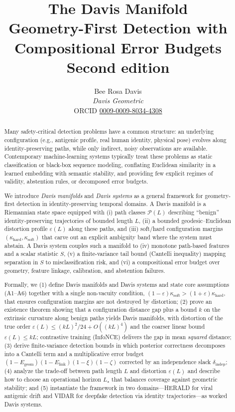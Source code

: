 \documentclass[11pt]{article}
\title{\textbf{The Davis Manifold}\\[0.5ex]
\large Geometry-First Detection with Compositional Error Budgets\\[0.3ex]
\normalsize Second edition}
\author{Bee Rosa Davis\\[1pt] {\normalsize\itshape Davis Geometric}\\[1pt]
{\footnotesize ORCID \href{https://orcid.org/0009-0009-8034-4308}{0009-0009-8034-4308}}}
\date{} %
\theoremstyle{remark}
\theoremstyle{plain}
\begin{document}
\maketitle
\vspace{-1.5ex}

\begin{abstract}
Many safety-critical detection problems have a common structure: an underlying configuration
(e.g., antigenic profile, real human identity, physical pose) evolves along identity-preserving
paths, while only indirect, noisy observations are available. Contemporary machine-learning
systems typically treat these problems as static classification or black-box sequence modeling,
conflating Euclidean similarity in a learned embedding with semantic stability, and providing
few explicit regimes of validity, abstention rules, or decomposed error budgets.

We introduce \emph{Davis manifolds} and \emph{Davis systems} as a general framework for
geometry-first detection in identity-preserving temporal domains. A Davis manifold is a
Riemannian state space equipped with (i) path classes $\mathcal{P}(L)$ describing ``benign''
identity-preserving trajectories of bounded length $L$, (ii) a bounded geodesic--Euclidean
distortion profile $\varepsilon(L)$ along these paths, and (iii) soft/hard configuration margins
$(\kappa_{\mathrm{hard}}, \kappa_{\mathrm{soft}})$ that carve out an explicit ambiguity band where the
system must abstain. A Davis system couples such a manifold to (iv) monotone
path-based features and a scalar statistic $S$, (v) a finite-variance tail bound (Cantelli
inequality) mapping separation in $S$ to misclassification risk, and (vi) a compositional
error budget over geometry, feature linkage, calibration, and abstention failures.

Formally, we (1) define Davis manifolds and Davis systems and state core assumptions
(A1--A6) together with a single non-vacuity condition,
$(1-\varepsilon)\kappa_{\mathrm{soft}} > (1+\varepsilon)\kappa_{\mathrm{hard}}$, that ensures configuration
margins are not destroyed by distortion; (2) prove an existence theorem showing that a configuration
distance gap plus a bound $k$ on the extrinsic curvature along benign paths yields Davis manifolds, with
distortion of the true order $\varepsilon(L) \le (kL)^2/24 + O((kL)^4)$ and the coarser linear bound
$\varepsilon(L) \le kL$; contrastive training (InfoNCE) delivers the gap in mean \emph{squared} distance;
(3) derive finite-variance detection bounds in which posterior correctness decomposes into
a Cantelli term and a multiplicative error budget $(1-E_{\text{geom}})(1-E_{\text{link}})
(1-\xi)(1-\zeta)$ corrected by an independence slack $\delta_{\text{indep}}$; (4) analyze the
trade-off between path length $L$ and distortion $\varepsilon(L)$ and describe how to choose
an operational horizon $L_\star$ that balances coverage against geometric stability; and
(5) instantiate the framework in two domains---HERALD for viral antigenic drift and
VIDAR for deepfake detection via identity trajectories---as worked Davis systems.


\end{abstract}
\end{document}
